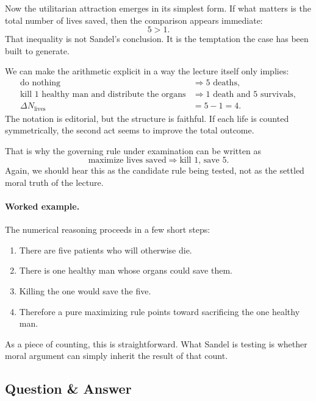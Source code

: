 Now the utilitarian attraction emerges in its simplest form. If what matters is the total number of lives saved, then the comparison appears immediate:
\begin{equation}
5 > 1.
\end{equation}
That inequality is not Sandel's conclusion. It is the temptation the case has been built to generate.

We can make the arithmetic explicit in a way the lecture itself only implies:
\begin{align}
\text{do nothing}
&\Longrightarrow
5 \text{ deaths},\\
\text{kill }1\text{ healthy man and distribute the organs}
&\Longrightarrow
1 \text{ death and }5 \text{ survivals},\\
\Delta N_{\text{lives}}
&=
5 - 1 = 4.
\end{align}
The notation is editorial, but the structure is faithful. If each life is counted symmetrically, the second act seems to improve the total outcome.

That is why the governing rule under examination can be written as
\begin{equation}
\text{maximize lives saved}
\Longrightarrow
\text{kill }1\text{, save }5.
\end{equation}
Again, we should hear this as the candidate rule being tested, not as the settled moral truth of the lecture.

\paragraph{Worked example.} The numerical reasoning proceeds in a few short steps:
\begin{enumerate}
\item There are five patients who will otherwise die.
\item There is one healthy man whose organs could save them.
\item Killing the one would save the five.
\item Therefore a pure maximizing rule points toward sacrificing the one healthy man.
\end{enumerate}
As a piece of counting, this is straightforward. What Sandel is testing is whether moral argument can simply inherit the result of that count.

\subsection{Question \& Answer}


